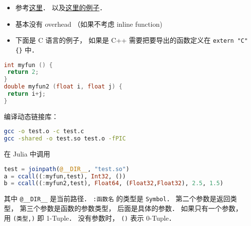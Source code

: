 
\begin{issues}
\issueDraft
\end{issues}

\begin{itemize}
\item 参考\href{https://docs.julialang.org/en/v1/manual/calling-c-and-fortran-code/}{这里}． 以及\href{https://discourse.julialang.org/t/how-to-make-julia-call-c-c-coded-function/54780/5}{这里的例子}．
\item 基本没有 overhead （如果不考虑 inline function)
\item 下面是 C 语言的例子， 如果是 C++ 需要把要导出的函数定义在 \verb|extern "C" {}| 中．
\end{itemize}

\begin{lstlisting}[language=cpp]
int myfun () {
 return 2;
}
double myfun2 (float i, float j) {
 return i+j;
}
\end{lstlisting}

编译动态链接库：
\begin{lstlisting}[language=bash]
gcc -o test.o -c test.c
gcc -shared -o test.so test.o -fPIC
\end{lstlisting}

在 Julia 中调用
\begin{lstlisting}[language=julia]
test = joinpath(@__DIR__, "test.so")
a = ccall((:myfun,test), Int32, ())
b = ccall((:myfun2,test), Float64, (Float32,Float32), 2.5, 1.5)
\end{lstlisting}
其中 \verb|@__DIR__| 是当前路径． \verb|:函数名| 的类型是 \verb|Symbol|． 第二个参数是返回类型， 第三个参数是函数的参数类型， 后面是具体的参数． 如果只有一个参数， 用 \verb|(类型,)| 即 1-Tuple． 没有参数时， \verb|()| 表示 0-Tuple．
